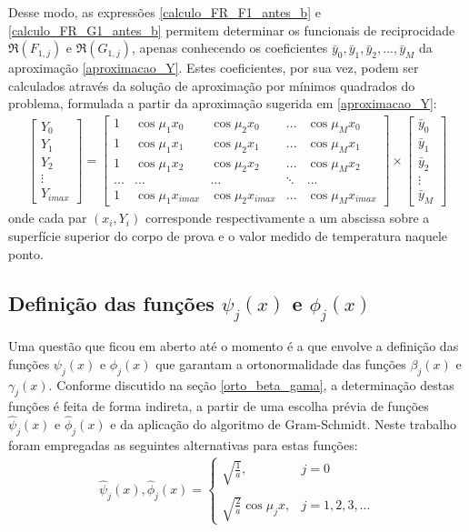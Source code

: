Desse modo, as expressões \eqref{calculo_FR_F1_antes_b} e \eqref{calculo_FR_G1_antes_b} permitem determinar os funcionais de reciprocidade $\Re(F_{1,j})$ e $\Re(G_{1,j})$, apenas conhecendo os coeficientes $\bar{y}_0, \bar{y}_1, \bar{y}_2, ..., \bar{y}_M$ da aproximação \eqref{aproximacao_Y}. Estes coeficientes, por sua vez, podem ser calculados através da solução de aproximação por mínimos quadrados do problema, formulada a partir da aproximação sugerida em \eqref{aproximacao_Y}:
\begin{align}
\begin{bmatrix}
Y_0 \\ Y_1 \\ Y_2 \\ \vdots \\ Y_{imax}
\end{bmatrix}
=
\begin{bmatrix}
1 & \cos\mu_1 x_0 & \cos \mu_2 x_0 & ... & \cos\mu_M x_0 \\
1 & \cos\mu_1 x_1 & \cos \mu_2 x_1 & ... & \cos\mu_M x_1 \\
1 & \cos\mu_1 x_2 & \cos \mu_2 x_2 & ... & \cos\mu_M x_2 \\
... & ... & ... & \ddots & ... \\
1 & \cos\mu_1 x_{imax} & \cos \mu_2 x_{imax} & ... & \cos\mu_M x_{imax}
\end{bmatrix}
\times
\begin{bmatrix}
\bar{y}_0 \\ \bar{y}_1 \\ \bar{y}_2 \\ \vdots \\ \bar{y}_M
\end{bmatrix}
\label{sistema_aproximacao_Y}
\end{align}
onde cada par $(x_i, Y_i)$ corresponde respectivamente a um abscissa sobre a superfície superior do corpo de prova e o valor medido de temperatura naquele ponto.


\subsection{Definição das funções $\psi_j(x)$ e $\phi_j(x)$}
Uma questão que ficou em aberto até o momento é a que envolve a definição das funções $\psi_j(x)$ e $\phi_j(x)$ que garantam a ortonormalidade das funções $\beta_j(x)$ e $\gamma_j(x)$. Conforme discutido na seção \ref{orto_beta_gama}, a determinação destas funções é feita de forma indireta, a partir de uma escolha prévia de funções $\hat{\psi}_j(x)$ e $\hat{\phi}_j(x)$ e da aplicação do algoritmo de Gram-Schmidt. Neste trabalho foram empregadas as seguintes alternativas para estas funções:
\begin{align}
\hat{\psi}_j(x), \hat{\phi}_j(x) = \left\lbrace
\begin{array}{ll}
\displaystyle\sqrt{\frac{1}{a}}, & j = 0 \\ \nonumber \\
\displaystyle\sqrt{\frac{2}{a}}\cos \mu_j x, & j = 1,2,3,\ldots
\end{array}
\right.
\end{align} 

